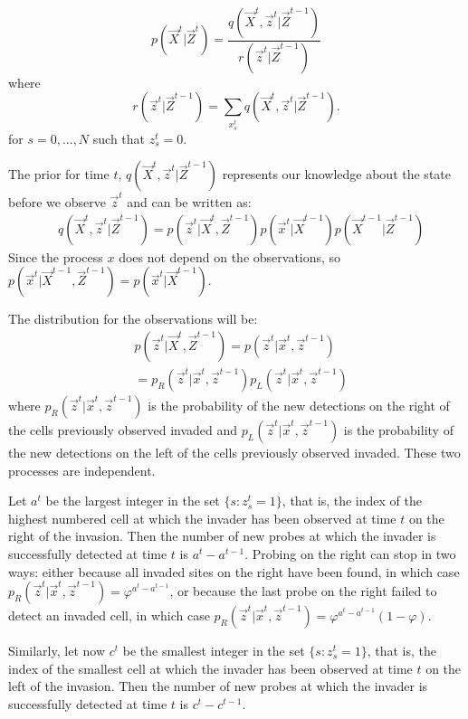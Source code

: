 \[
    p(\vec{X}^{t} | \vec{Z}^{t})  =  \frac{q(\vec{X}^{t}, \vec{z}^{t} | \vec{Z}^{t-1})}{r(\vec{z}^{t} | \vec{Z}^{t-1})}
\]
where 
\[
    r(\vec{z}^{t} | \vec{Z}^{t-1}) = \sum_{x_s^{t}} q(\vec{X}^{t}, \vec{z}^{t} | \vec{Z}^{t-1}).
\]
for $s = 0, \dots, N$ such that $z_s^{t}=0$.

The prior for time $t$, $q(\vec{X}^{t}, \vec{z}^t | \vec{Z}^{t-1})$ represents our knowledge about the state before we observe $\vec{z}^{t}$ and can be written as:
\begin{align}
    & q(\vec{X}^{t}, \vec{z}^{t} | \vec{Z}^{t-1}) = p(\vec{z}^{t} | \vec{X}^{t}, \vec{Z}^{t-1}) p(\vec{x}^{t} | \vec{X}^{t-1}) p(\vec{X}^{t-1} | \vec{Z}^{t-1}) \label{eq:3}
\end{align}
Since the process $x$ does not depend on the observations, so $p(\vec{x}^{t} | \vec{X}^{t-1}, \vec{Z}^{t-1}) = p(\vec{x}^{t} | \vec{X}^{t-1})$.

The distribution for the observations will be:
\begin{align*}
    & p(\vec{z}^{t} | \vec{X}^{t}, \vec{Z}^{t-1}) = p(\vec{z}^{t} | \vec{x}^{t}, \vec{z}^{t-1}) \\
    & = p_R(\vec{z}^{t} | \vec{x}^{t}, \vec{z}^{t-1}) p_L(\vec{z}^{t} | \vec{x}^{t}, \vec{z}^{t-1})
\end{align*}
where $p_R(\vec{z}^{t} | \vec{x}^{t}, \vec{z}^{t-1})$ is the probability of the new detections on the right of the cells previously observed invaded and $p_L(\vec{z}^{t} | \vec{x}^{t}, \vec{z}^{t-1})$ is the probability of the new detections on the left of the cells previously observed invaded. These two processes are independent.

Let $a^{t}$ be the largest integer in the set $\{ s : z_s^{t} = 1 \}$, that is, the index of the highest numbered cell at which the invader has been observed at time $t$ on the right of the invasion. Then the number of new probes at which the invader is successfully detected at time $t$ is $a^{t} - a^{t-1}$. Probing on the right can stop in two ways: either because all invaded sites on the right have been found, in which case $p_R(\vec{z}^{t} | \vec{x}^{t}, \vec{z}^{t-1}) = \varphi^{a^{t} - a^{t-1}}$, or because the last probe on the right failed to detect an invaded cell, in which case $p_R(\vec{z}^{t} | \vec{x}^{t}, \vec{z}^{t-1}) = \varphi^{a^{t} - a^{t-1}} (1 - \varphi)$.

Similarly, let now $c^{t}$ be the smallest integer in the set $\{ s : z_s^{t} = 1 \}$, that is, the index of the smallest cell at which the invader has been observed at time $t$ on the left of the invasion. Then the number of new probes at which the invader is successfully detected at time $t$ is $c^{t} - c^{t-1}$.

